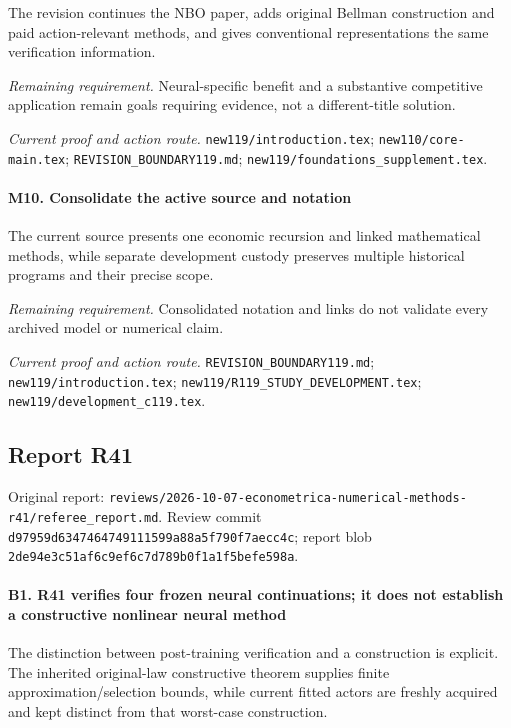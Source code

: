 The revision continues the NBO paper, adds original Bellman construction and paid action-relevant methods, and gives conventional representations the same verification information.

\par\emph{Remaining requirement.} Neural-specific benefit and a substantive competitive application remain goals requiring evidence, not a different-title solution.

\par\emph{Current proof and action route.} \nolinkurl{new119/introduction.tex}; \nolinkurl{new110/core-main.tex}; \nolinkurl{REVISION_BOUNDARY119.md}; \nolinkurl{new119/foundations_supplement.tex}.

\paragraph{M10. Consolidate the active source and notation}

The current source presents one economic recursion and linked mathematical methods, while separate development custody preserves multiple historical programs and their precise scope.

\par\emph{Remaining requirement.} Consolidated notation and links do not validate every archived model or numerical claim.

\par\emph{Current proof and action route.} \nolinkurl{REVISION_BOUNDARY119.md}; \nolinkurl{new119/introduction.tex}; \nolinkurl{new119/R119_STUDY_DEVELOPMENT.tex}; \nolinkurl{new119/development_c119.tex}.

\subsection{Report R41}

Original report: \nolinkurl{reviews/2026-10-07-econometrica-numerical-methods-r41/referee_report.md}. Review commit \nolinkurl{d97959d6347464749111599a88a5f790f7aecc4c}; report blob \nolinkurl{2de94e3c51af6c9ef6c7d789b0f1a1f5befe598a}.

\paragraph{B1. R41 verifies four frozen neural continuations; it does not establish a constructive nonlinear neural method}

The distinction between post-training verification and a construction is explicit. The inherited original-law constructive theorem supplies finite approximation/\allowbreak{}selection bounds, while current fitted actors are freshly acquired and kept distinct from that worst-case construction.

